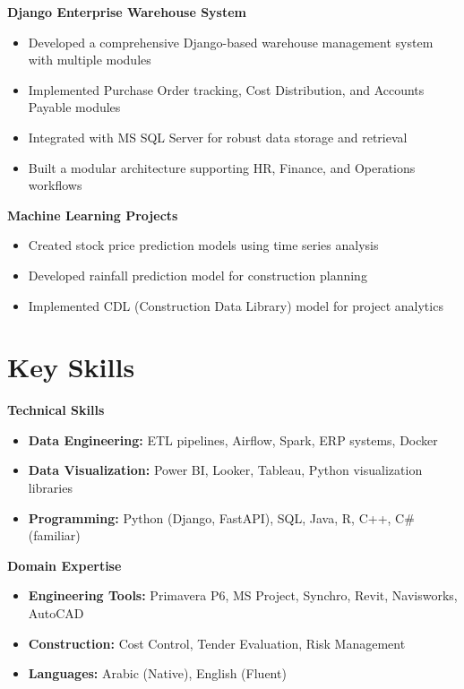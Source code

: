 \documentclass[10pt, letterpaper]{article}
\begin{document}
\begin{mdframed}[style=cvframe]
\begin{multicols}{2}
\textbf{Django Enterprise Warehouse System}
\begin{itemize}[leftmargin=*]
    \item Developed a comprehensive Django-based warehouse management system with multiple modules
    \item Implemented Purchase Order tracking, Cost Distribution, and Accounts Payable modules
    \item Integrated with MS SQL Server for robust data storage and retrieval
    \item Built a modular architecture supporting HR, Finance, and Operations workflows
\end{itemize}

\textbf{Machine Learning Projects}
\begin{itemize}[leftmargin=*]
    \item Created stock price prediction models using time series analysis
    \item Developed rainfall prediction model for construction planning
    \item Implemented CDL (Construction Data Library) model for project analytics
\end{itemize}

\columnbreak

\section{Key Skills}
\textbf{\textcolor{primaryColor}{Technical Skills}}
\begin{itemize}[leftmargin=*]
    \item \textbf{Data Engineering:} ETL pipelines, Airflow, Spark, ERP systems, Docker
    \item \textbf{Data Visualization:} Power BI, Looker, Tableau, Python visualization libraries
    \item \textbf{Programming:} Python (Django, FastAPI), SQL, Java, R, C++, C\# (familiar)
\end{itemize}

\textbf{\textcolor{primaryColor}{Domain Expertise}}
\begin{itemize}[leftmargin=*]
    \item \textbf{Engineering Tools:} Primavera P6, MS Project, Synchro, Revit, Navisworks, AutoCAD
    \item \textbf{Construction:} Cost Control, Tender Evaluation, Risk Management
    \item \textbf{Languages:} Arabic (Native), English (Fluent)
\end{itemize}


\end{multicols}
\end{mdframed}
\end{document}
